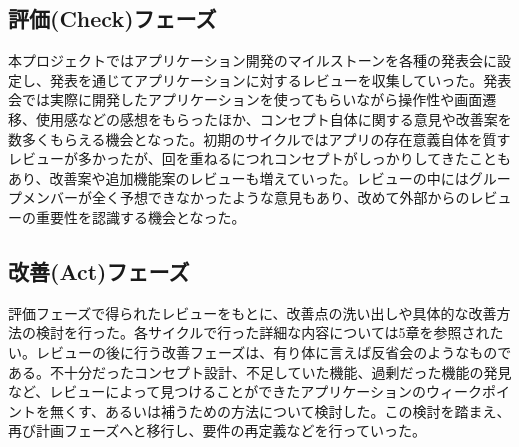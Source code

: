 \subsection{評価(Check)フェーズ}
本プロジェクトではアプリケーション開発のマイルストーンを各種の発表会に設定し、発表を通じてアプリケーションに対するレビューを収集していった。発表会では実際に開発したアプリケーションを使ってもらいながら操作性や画面遷移、使用感などの感想をもらったほか、コンセプト自体に関する意見や改善案を数多くもらえる機会となった。初期のサイクルではアプリの存在意義自体を質すレビューが多かったが、回を重ねるにつれコンセプトがしっかりしてきたこともあり、改善案や追加機能案のレビューも増えていった。レビューの中にはグループメンバーが全く予想できなかったような意見もあり、改めて外部からのレビューの重要性を認識する機会となった。
\subsection{改善(Act)フェーズ}
評価フェーズで得られたレビューをもとに、改善点の洗い出しや具体的な改善方法の検討を行った。各サイクルで行った詳細な内容については5章を参照されたい。レビューの後に行う改善フェーズは、有り体に言えば反省会のようなものである。不十分だったコンセプト設計、不足していた機能、過剰だった機能の発見など、レビューによって見つけることができたアプリケーションのウィークポイントを無くす、あるいは補うための方法について検討した。この検討を踏まえ、再び計画フェーズへと移行し、要件の再定義などを行っていった。
